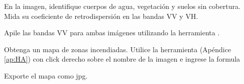 \begin{que}
    En la imagen, identifique cuerpos de agua, vegetación y suelos sin cobertura. Mida su coeficiente de retrodispersión en las bandas VV y VH.
\end{que}

\begin{que}
  Apile las bandas VV para ambas imágenes utilizando la herramienta .
\end{que}

\begin{que}
  Obtenga un mapa de zonas incendiadas. Utilice la herramienta  (Apéndice \ref{ap:HA}) con click derecho sobre el nombre de la imagen e ingrese la formula
  \begin{center}
  \end{center}
\end{que}

\begin{que}
    Exporte el mapa como jpg.
\end{que}
